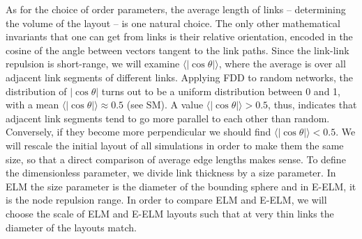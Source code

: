 \documentclass[nofootinbib,preprint,endfloats]{revtex4} %
\begin{document}
As for the choice of order parameters, the average length of links -- determining the volume of the layout -- is one natural choice.  
The only other mathematical invariants that one can get from links %
is their relative orientation, encoded in the cosine of the angle between vectors tangent to the link paths. 
Since the link-link repulsion is short-range, 
we will examine $\langle |\cos\theta |\rangle$, where the average is over all adjacent link segments of different links.  
Applying FDD to random networks,  %
the distribution of $|\cos\theta |$ turns out to be a uniform distribution between 0 and 1, with a mean $\langle |\cos\theta |\rangle \approx 0.5$ (see SM). 
A value $\langle |\cos\theta |\rangle > 0.5 $, thus, indicates that adjacent link segments tend to go more parallel to each other than random. 
Conversely, if they become more perpendicular we should find $\langle |\cos\theta |\rangle < 0.5 $. 
We will rescale the initial layout of all simulations in order to make them the same size, so that a direct comparison of average edge lengths makes sense. To define the dimensionless parameter, we divide link thickness by a size parameter. 
In ELM the size parameter is the diameter of the bounding sphere and in E-ELM, it is the node repulsion range. 
In order to compare ELM and E-ELM, we will choose the scale of ELM and E-ELM layouts such that at very thin links the diameter of the layouts match. 
\end{document}
